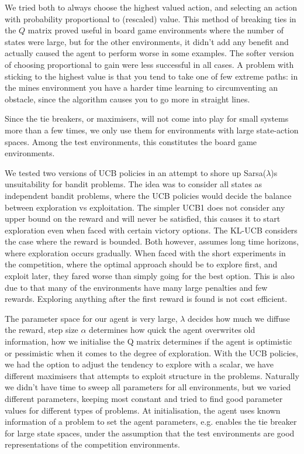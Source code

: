 We tried both to always choose
the highest valued action, and selecting an action with probability proportional
to (rescaled) value. This method of breaking ties in the $Q$ matrix proved useful
in board game environments  where the number of states were large, but for the
other environments, it didn't add any benefit and actually caused the agent to
perform worse in some examples. The softer version of choosing proportional to
gain were less successful in all cases. A problem with sticking to the highest
value is that you tend to take one of few extreme paths: in the mines
environment you have a harder time learning to circumventing an obstacle, since
the algorithm causes you to go more in straight lines.

Since the tie breakers, or maximisers, will not come into play for small systems more than a few times, we only use them for environments with large state-action spaces. Among the test environments, this constitutes the board game environments.

We tested two versions of UCB policies in an attempt to shore up Sarsa($\lambda$)s unsuitability for bandit problems. The idea was to consider all states as independent bandit problems, where the UCB policies would decide the balance between exploration vs exploitation. The simpler UCB1 does not consider any upper bound on the reward and will never be satisfied, this causes it to start exploration even when faced with certain victory options. The KL-UCB considers the case where the reward is bounded. Both however, assumes long time horizons, where exploration occurs gradually. When faced with the short experiments in the competition, where the optimal approach should be to explore first, and exploit later, they fared worse than simply going for the best option. This is also due to that many of the environments have many large penalties and few rewards. Exploring anything after the first reward is found is not cost efficient. 

The parameter space for our agent is very large, $\lambda$ decides how much we diffuse the reward, step size $\alpha$ determines how quick the agent overwrites old information, how we initialise the Q matrix determines if the agent is optimistic or pessimistic when it comes to the degree of exploration. With the UCB policies, we had the option to adjust the tendency to explore with a scalar, we have different maximisers that attempts to exploit structure in the problems. Naturally we didn't have time to sweep all parameters for all environments, but we varied different parameters, keeping most constant and tried to find good parameter values for different types of problems. At initialisation, the agent uses known information of a problem to set the agent parameters, e.g. enables the tie breaker for large state spaces, under the assumption that the test environments are good representations of the competition environments.

